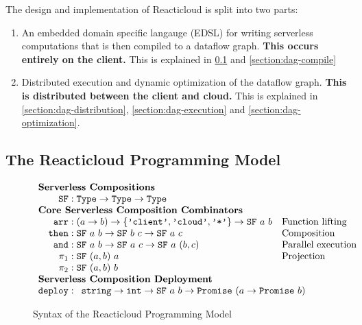 \documentclass[10pt,sigplan,screen,nonacm]{acmart}
\begin{document}
The design and implementation of Reacticloud is split into
two parts:
\begin{enumerate}
	\item An embedded domain specific langauge (EDSL) for writing serverless
computations that is then compiled to a dataflow graph. 
\textbf{This occurs entirely on the client.} This is explained
in \cref{section:model} and \cref{section:dag-compile}

	\item Distributed execution and dynamic optimization
	of the dataflow graph. \textbf{This is distributed between the client and cloud.}
	This is explained
in \cref{section:dag-distribution}, \cref{section:dag-execution} and \cref{section:dag-optimization}.
\end{enumerate}


\subsection{The Reacticloud Programming Model}
\label{section:model}



\begin{figure}
  \footnotesize
  \[
    \begin{array}{r@{\;}c@{\;}ll}
			\multicolumn{3}{l}{\textbf{Serverless Compositions}} \\
			\texttt{SF} &:& \texttt{Type} \to \texttt{Type} \to \texttt{Type} & \\
      \multicolumn{3}{l}{\textbf{Core Serverless Composition Combinators}} \\
			\texttt{arr} &:& (a \to b) \to \{ \texttt{'client'}, \texttt{'cloud'}, \texttt{'*'} \} \to \texttt{SF}~a~b & \text{Function lifting} \\
			\texttt{then} &:& \texttt{SF}~a~b \to \texttt{SF}~b~c \to \texttt{SF}~a~c & \text{Composition} \\
			\texttt{and} &:& \texttt{SF}~a~b \to \texttt{SF}~a~c \to \texttt{SF}~a~(b, c) & \text{Parallel execution} \\
			\pi_1 &:& \texttt{SF}~(a, b)~a & \text{Projection} \\
			\pi_2 &:& \texttt{SF}~(a, b)~b & \\
			\multicolumn{3}{l}{\textbf{Serverless Composition Deployment}} \\
			\texttt{deploy} &:& \multicolumn{2}{l}{\texttt{string} \to \texttt{int} \to \texttt{SF}~a~b \to \texttt{Promise}~(a \to \texttt{Promise}~b)}
    \end{array}
  \]

	\caption{Syntax of the Reacticloud Programming Model}
  \label{fig:model}
\end{figure}
\end{document}
